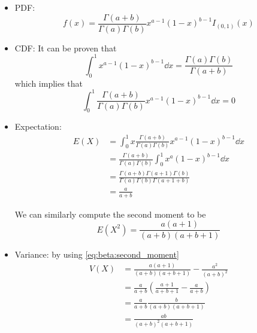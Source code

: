 \documentclass[14pt]{extarticle}
\begin{document}
\begin{itemize}
    \item PDF:
          \begin{equation}
              f(x) = \frac{\Gamma(a+b)}{\Gamma(a)\Gamma(b)}x^{a-1}(1-x)^{b-1}I_{(0,1)}(x)
          \end{equation}
    \item CDF: It can be proven that
          \begin{equation}
              \int_0^1 x^{a -1}(1-x)^{b-1} \dd{x} = \frac{\Gamma(a) \Gamma(b)}{\Gamma(a + b)}
          \end{equation}
          which implies that
          \begin{equation}
              \int_0^1 \frac{\Gamma(a+b)}{\Gamma(a)\Gamma(b)}x^{a-1}(1-x)^{b-1} \dd{x}= 0
          \end{equation}
    \item Expectation:
          \begin{align}
              E(X) & = \int_0^1 x \frac{\Gamma(a+b)}{\Gamma(a)\Gamma(b)}x^{a-1}(1-x)^{b-1} \dd{x}       \\
                   & = \frac{\Gamma(a+b)}{\Gamma(a)\Gamma(b)} \int_0^1 x^a (1-x)^{b-1} \dd{x}           \\
                   & = \frac{\Gamma(a + b) \Gamma(a+1) \Gamma(b)}{\Gamma(a) \Gamma(b) \Gamma(a + 1+ b)} \\
                   & = \frac{a}{a+b}
          \end{align}

          We can similarly compute the second moment to be
          \begin{equation}
              \label{eq:beta:second_moment}
              E(X^2) = \frac{a(a+1)}{(a+b)(a+ b+ 1)}
          \end{equation}
    \item Variance: by using \autoref{eq:beta:second_moment}
          \begin{align}
              V(X) & = \frac{a(a+1)}{(a+b)(a+ b+ 1)} - \frac{a^2}{(a + b)^2}               \\
                   & = \frac{a}{a+ b} \left(\frac{a + 1}{a + b + 1} - \frac{a}{a+b}\right) \\
                   & = \frac{a}{a+b} \frac{b}{(a+b)(a + b + 1)}                            \\
                   & = \frac{ab}{(a+b)^2(a+b+1)}
          \end{align}
\end{itemize}
\end{document}
